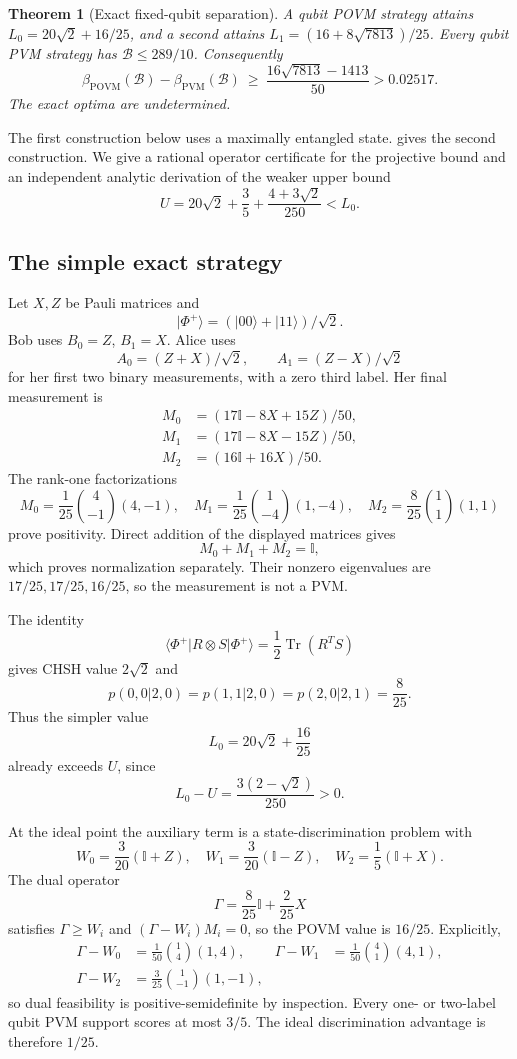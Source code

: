 \documentclass[11pt]{article}
\newtheorem{theorem}{Theorem}[section]
\theoremstyle{definition}
\newcommand{\Tr}{\operatorname{Tr}}
\newcommand{\id}{\mathbb I}
\newcommand{\POVM}{\mathrm{POVM}}
\newcommand{\PVM}{\mathrm{PVM}}
\newcommand{\Bell}{\mathcal B}
\begin{document}
\begin{theorem}[Exact fixed-qubit separation]
\label{thm:separation}
A qubit POVM strategy attains \(L_0=20\sqrt2+16/25\), and a second attains
\(L_1=(16+8\sqrt{7813})/25\). Every qubit PVM strategy has
\(\Bell\le289/10\). Consequently
\[
 \beta_{\POVM}(\Bell)-\beta_{\PVM}(\Bell)
 \ \ge\ \frac{16\sqrt{7813}-1413}{50}>0.02517.
\]
The exact optima are undetermined.
\end{theorem}

The first construction below uses a maximally entangled state.
 gives the second construction. We give a rational
operator certificate for the projective bound and an independent analytic
derivation of the weaker upper bound
\[
 U=20\sqrt2+\frac35+\frac{4+3\sqrt2}{250}<L_0 .
\]

\subsection{The simple exact strategy}

Let \(X,Z\) be Pauli matrices and
\[
|\Phi^+\rangle=(|00\rangle+|11\rangle)/\sqrt2.
\]
Bob uses \(B_0=Z\), \(B_1=X\). Alice uses
\[
A_0=(Z+X)/\sqrt2,\qquad A_1=(Z-X)/\sqrt2
\]
for her first two binary measurements, with a zero third label. Her final
measurement is
\[
\begin{aligned}
M_0&=(17\id-8X+15Z)/50,\\
M_1&=(17\id-8X-15Z)/50,\\
M_2&=(16\id+16X)/50.
\end{aligned}
\]
The rank-one factorizations
\[
M_0=\frac1{25}\binom4{-1}(4,-1),\quad
M_1=\frac1{25}\binom1{-4}(1,-4),\quad
M_2=\frac8{25}\binom11(1,1)
\]
prove positivity. Direct addition of the displayed matrices gives
\[
M_0+M_1+M_2=\id,
\]
which proves normalization separately. Their nonzero eigenvalues are
\(17/25,17/25,16/25\), so the measurement is not a PVM.

The identity
\[
\langle\Phi^+|R\otimes S|\Phi^+\rangle
=\frac12\Tr(R^TS)
\]
gives CHSH value \(2\sqrt2\) and
\[
p(0,0|2,0)=p(1,1|2,0)=p(2,0|2,1)=\frac8{25}.
\]
Thus the simpler value
\[
L_0=20\sqrt2+\frac{16}{25}
\]
already exceeds \(U\), since
\[
L_0-U=\frac{3(2-\sqrt2)}{250}>0.
\]

At the ideal point the auxiliary term is a state-discrimination problem with
\[
W_0=\frac3{20}(\id+Z),\quad
W_1=\frac3{20}(\id-Z),\quad
W_2=\frac15(\id+X).
\]
The dual operator
\[
\Gamma=\frac8{25}\id+\frac2{25}X
\]
satisfies \(\Gamma\ge W_i\) and
\((\Gamma-W_i)M_i=0\), so the POVM value is \(16/25\).
Explicitly,
\[
\begin{aligned}
\Gamma-W_0&=\frac1{50}\binom14(1,4),&
\Gamma-W_1&=\frac1{50}\binom41(4,1),\\
\Gamma-W_2&=\frac3{25}\binom1{-1}(1,-1),
\end{aligned}
\]
so dual feasibility is positive-semidefinite by inspection.
Every one- or two-label qubit PVM support scores at most \(3/5\). The ideal
discrimination advantage is therefore \(1/25\).
\end{document}
